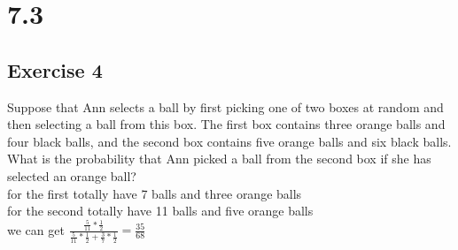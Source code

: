 \documentclass[12pt]{article}
\begin{document}
\section*{7.3}
\subsection*{Exercise 4}
Suppose that Ann selects a ball by first picking one of two boxes at random and then selecting a ball from this box. The first box contains three orange balls and four black balls, and the second box contains five orange balls and six black balls. What is the probability that Ann picked a ball from the second box if she has selected an orange ball?\\
for the first totally have 7 balls and three orange balls\\
for the second totally have 11 balls and five orange balls\\
we can get $\frac{\frac{5}{11}*\frac{1}{2}}{\frac{5}{11}*\frac{1}{2}+\frac{3}{7}*\frac{1}{2}}=\frac{35}{68}$\\
\\
\end{document}
